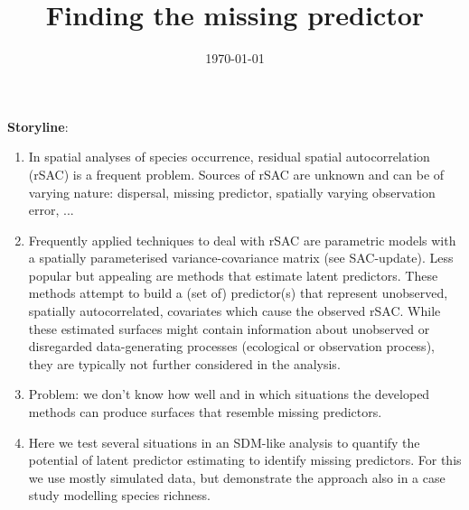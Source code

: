 \documentclass[11pt]{article}
\title{Finding the missing predictor}
\date{\today} %
\begin{document}
	\maketitle
	
\textbf{Storyline}:
	\begin{enumerate}
		\item In spatial analyses of species occurrence, residual spatial autocorrelation (rSAC) is a frequent problem. 
		Sources of rSAC are unknown and can be of varying nature: dispersal, missing predictor, spatially varying observation error, ...
		\item Frequently applied techniques to deal with rSAC are parametric models with a spatially parameterised variance-covariance matrix (see SAC-update). Less popular but appealing are methods that estimate latent predictors. These methods attempt to build a (set of) predictor(s) that represent unobserved, spatially autocorrelated, covariates which cause the observed rSAC. While these estimated surfaces might contain information about unobserved or disregarded data-generating processes (ecological or observation process), they are typically not further considered in the analysis. 
		\item Problem: we don't know how well and in which situations the developed methods can produce surfaces that resemble missing predictors. 
		\item Here we test several situations in an SDM-like analysis to quantify the potential of latent predictor estimating to identify missing predictors. For this we use mostly simulated data, but demonstrate the approach also in a case study modelling species richness.

	\end{enumerate}	
\end{document}
